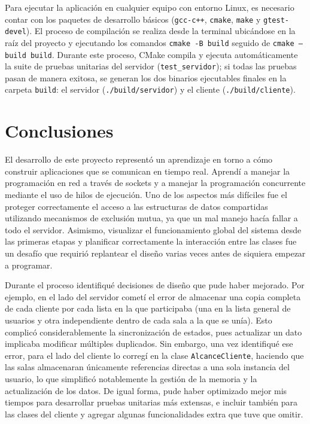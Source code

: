 \documentclass[11pt,a4paper]{article}
\begin{document}
Para ejecutar la aplicación en cualquier equipo con entorno Linux, es necesario contar con los paquetes de desarrollo básicos (\texttt{gcc-c++}, \texttt{cmake}, \texttt{make} y \texttt{gtest-devel}). El proceso de compilación se realiza desde la terminal ubicándose en la raíz del proyecto y ejecutando los comandos \texttt{cmake -B build} seguido de \texttt{cmake --build build}. Durante este proceso, CMake compila y ejecuta automáticamente la suite de pruebas unitarias del servidor (\texttt{test\_servidor}); si todas las pruebas pasan de manera exitosa, se generan los dos binarios ejecutables finales en la carpeta \texttt{build}: el servidor (\texttt{./build/servidor}) y el cliente (\texttt{./build/cliente}).

\section{Conclusiones}

El desarrollo de este proyecto representó un aprendizaje en torno a cómo construir aplicaciones que se comunican en tiempo real. Aprendí a manejar la programación en red a través de sockets y a manejar la programación concurrente mediante el uso de hilos de ejecución. Uno de los aspectos más difíciles fue el proteger correctamente el acceso a las estructuras de datos compartidas utilizando mecanismos de exclusión mutua, ya que un mal manejo hacía fallar a todo el servidor. Asimismo, visualizar el funcionamiento global del sistema desde las primeras etapas y planificar correctamente la interacción entre las clases fue un desafío que requirió replantear el diseño varias veces antes de siquiera empezar a programar.

Durante el proceso identifiqué decisiones de diseño que pude haber mejorado. Por ejemplo, en el lado del servidor cometí el error de almacenar una copia completa de cada cliente por cada lista en la que participaba (una en la lista general de usuarios y otra independiente dentro de cada sala a la que se unía). Esto complicó considerablemente la sincronización de estados, pues actualizar un dato implicaba modificar múltiples duplicados. Sin embargo, una vez identifiqué ese error, para el lado del cliente lo corregí en la clase \texttt{AlcanceCliente}, haciendo que las salas almacenaran únicamente referencias directas a una sola instancia del usuario, lo que simplificó notablemente la gestión de la memoria y la actualización de los datos. De igual forma, pude haber optimizado mejor mis tiempos para desarrollar pruebas unitarias más extensas, e incluir también para las clases del cliente y agregar algunas funcionalidades extra que tuve que omitir.
\end{document}
